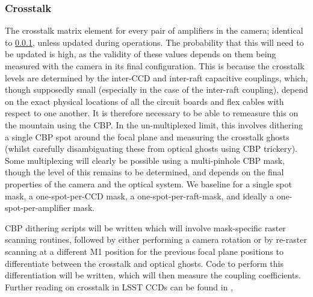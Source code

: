 \subsubsection{Crosstalk}\label{sec:CPP:output:crosstalk}
The crosstalk matrix element for every pair of amplifiers in the camera; identical to \secsymbol\ref{sec:CPP:output:crosstalk}, unless updated during operations. The probability that this will need to be updated is high, as the validity of these values depends on them being measured with the camera in its final configuration. This is because the crosstalk levels are determined by the inter-CCD and inter-raft capacitive couplings, which, though supposedly small (especially in the case of the inter-raft coupling), depend on the exact physical locations of all the circuit boards and flex cables with respect to one another. It is therefore necessary to be able to remeasure this on the mountain using the CBP.
\alg In the un-multiplexed limit, this involves dithering a single CBP spot around the focal plane and measuring the crosstalk ghosts (whilst carefully disambiguating these from optical ghosts using CBP trickery). Some multiplexing will clearly be possible using a multi-pinhole CBP mask, though the level of this remains to be determined, and depends on the final properties of the camera and the optical system. We baseline for a single spot mask, a one-spot-per-CCD mask, a one-spot-per-raft-mask, and ideally a one-spot-per-amplifier mask.

CBP dithering scripts will be written which will involve mask-specific raster scanning routines, followed by either performing a camera rotation or by re-raster scanning at a different M1 position for the previous focal plane positions to differentiate between the crosstalk and optical ghosts. Code to perform this differentiation will be written, which will then measure the coupling coefficients. Further reading on crosstalk in LSST CCDs can be found in \cite{OConnor15},

